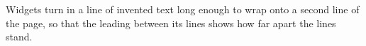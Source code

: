 \documentclass[doublespacing]{inventedplain}
\begin{document}
Widgets turn in a line of invented text long enough to wrap onto a second line of the page,
so that the leading between its lines shows how far apart the lines stand.
\end{document}
